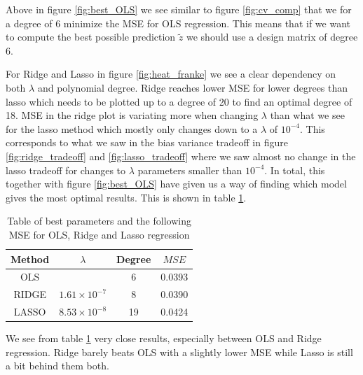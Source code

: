 \documentclass[12pt]{article}
\begin{document}
Above in figure \ref{fig:best_OLS} we see similar to figure \ref{fig:cv_comp} that we for a degree of 6 minimize the MSE for OLS regression. This means that if we want to compute the best possible prediction $\tilde{z}$ we should use a design matrix of degree 6.

For Ridge and Lasso in figure \ref{fig:heat_franke} we see a clear dependency on both $\lambda$ and polynomial degree. Ridge reaches lower MSE for lower degrees than lasso which needs to be plotted up to a degree of 20 to find an optimal degree of 18. MSE in the ridge plot is variating more when changing $\lambda$ than what we see for the lasso method which mostly only changes down to a $\lambda$ of $10^{-4}$. This corresponds to what we saw in the bias variance tradeoff in figure \ref{fig:ridge_tradeoff} and \ref{fig:lasso_tradeoff} where we saw almost no change in the lasso tradeoff for changes to $\lambda$ parameters smaller than $10^{-4}$. In total, this together with figure \ref{fig:best_OLS} have given us a way of finding which model gives the most optimal results. This is shown in table \ref{tab:best_comp}.
\begin{table}[H]
  \centering
  \caption{Table of best parameters and the following MSE for OLS, Ridge and Lasso regression}
  \label{tab:best_comp}
  \begin{tabular}{|c||c|c|c|}
    \hline
    Method & $\lambda$ & Degree & $MSE$ \\
    \hline
    OLS &  & 6 & 0.0393 \\
    \hline
    RIDGE & $1.61\times10^{-7}$ & 8 & 0.0390 \\
    \hline
    LASSO & $8.53\times10^{-8}$ & 19 & 0.0424 \\
    \hline
  \end{tabular}
\end{table}
We see from table \ref{tab:best_comp} very close results, especially between OLS and Ridge regression. Ridge barely beats OLS with a slightly lower MSE while Lasso is still a bit behind them both.
\end{document}
